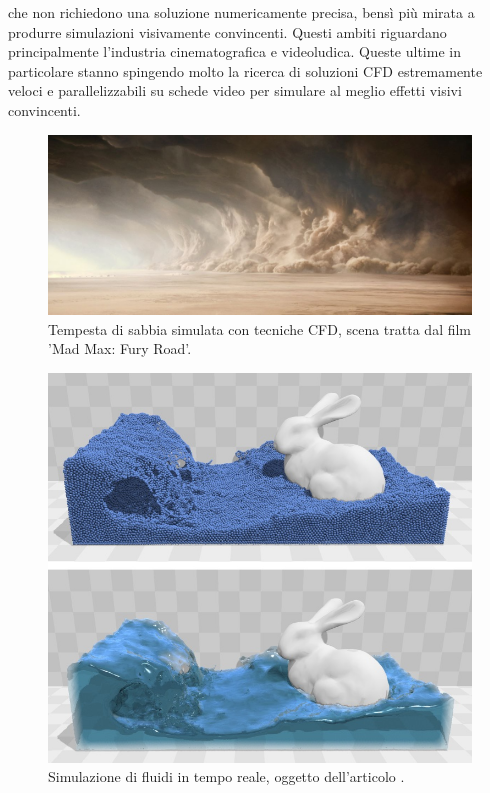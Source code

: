 che non richiedono una soluzione numericamente precisa, bensì più mirata a produrre simulazioni visivamente convincenti.
Questi ambiti riguardano principalmente l'industria cinematografica e videoludica. Queste ultime in particolare stanno spingendo molto la ricerca di soluzioni CFD estremamente veloci e parallelizzabili 
su schede video per simulare al meglio effetti visivi convincenti. 
\begin{figure}[H]
    \centering
    \includegraphics[width=\linewidth]{figure/madmax.jpg}
    \caption{Tempesta di sabbia simulata con tecniche CFD, scena tratta dal film 'Mad Max: Fury Road'.}
\end{figure}
\begin{figure}[H]
    \centering
    \includegraphics[width=\linewidth]{figure/pbf.jpeg}
    \caption{Simulazione di fluidi in tempo reale, oggetto dell'articolo \cite{macklin2013position}.}
\end{figure}